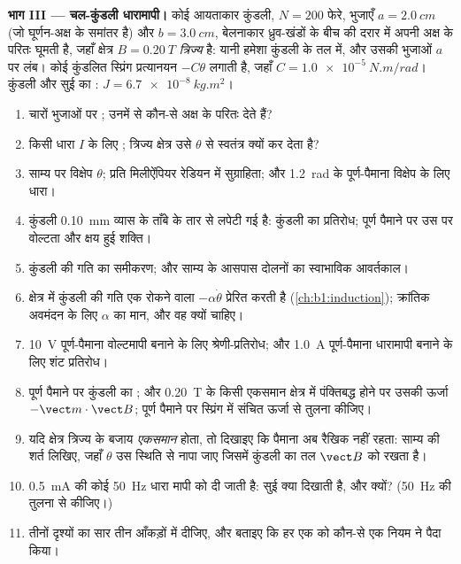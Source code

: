 \begin{problem}[{सप्ताहांत समस्या --- किसी समाक्ष तार पर ऐंपियर का नियम,
किसी विद्युत लाइन पर लाप्लास बल, और किसी चल-कुंडली धारामापी का
अभिकल्प}]
\medskip
\noindent\textbf{भाग III --- चल-कुंडली धारामापी।}
कोई आयताकार कुंडली, $N = 200$ फेरे, भुजाएँ $a = \qty{2.0}{cm}$ (जो
घूर्णन-अक्ष के समांतर है) और $b = \qty{3.0}{cm}$, बेलनाकार ध्रुव-खंडों के
बीच की दरार में अपनी अक्ष के परितः घूमती है, जहाँ क्षेत्र $B = \qty{0.20}{T}$
\emph{त्रिज्य} है: यानी हमेशा कुंडली के तल में, और उसकी भुजाओं $a$ पर लंब।
कोई कुंडलित स्प्रिंग प्रत्यानयन  $-C\theta$ लगाती है, जहाँ
$C = \qty{1.0e-5}{N.m/rad}$। कुंडली और सुई का :
$J = \qty{6.7e-8}{kg.m^2}$।
\begin{enumerate}[resume]
  \item चारों भुजाओं पर ; उनमें से कौन-से अक्ष के परितः
         देते हैं?
  \item किसी धारा $I$ के लिए ; त्रिज्य क्षेत्र उसे $\theta$ से
        स्वतंत्र क्यों कर देता है?
  \item साम्य पर विक्षेप $\theta$; प्रति मिलीऐंपियर रेडियन में सुग्राहिता;
        और \qty{1.2}{rad} के पूर्ण-पैमाना विक्षेप के लिए धारा।
  \item कुंडली \qty{0.10}{mm} व्यास के ताँबे के तार से लपेटी गई है:
        कुंडली का प्रतिरोध; पूर्ण पैमाने पर उस पर वोल्टता और क्षय हुई
        शक्ति।
  \item कुंडली की गति का समीकरण; और साम्य के आसपास दोलनों का स्वाभाविक
        आवर्तकाल।
  \item क्षेत्र में कुंडली की गति एक रोकने वाला 
        $-\alpha\dot\theta$ प्रेरित करती है (\cref{ch:b1:induction});
        क्रांतिक अवमंदन के लिए $\alpha$ का मान, और वह क्यों चाहिए।
  \item \qty{10}{V} पूर्ण-पैमाना वोल्टमापी बनाने के लिए श्रेणी-प्रतिरोध; और
        \qty{1.0}{A} पूर्ण-पैमाना धारामापी बनाने के लिए शंट प्रतिरोध।
  \item पूर्ण पैमाने पर कुंडली का ; और \qty{0.20}{T} के किसी
        एकसमान क्षेत्र में पंक्तिबद्ध होने पर उसकी ऊर्जा $-\vect m\cdot
        \vect B$; पूर्ण पैमाने पर स्प्रिंग में संचित ऊर्जा से तुलना कीजिए।
  \item यदि क्षेत्र त्रिज्य के बजाय \emph{एकसमान} होता, तो दिखाइए कि पैमाना
        अब रैखिक नहीं रहता: साम्य की शर्त लिखिए, जहाँ
        $\theta$ उस स्थिति से नापा जाए जिसमें कुंडली का तल
        $\vect B$ को रखता है।
  \item \qty{0.5}{mA}  की कोई \qty{50}{Hz} धारा मापी को दी जाती है:
        सुई क्या दिखाती है, और क्यों? (\qty{50}{Hz} की तुलना  से कीजिए।)
  \item तीनों दृश्यों का सार तीन आँकड़ों में दीजिए, और बताइए कि हर एक को
        कौन-से एक नियम ने पैदा किया।
\end{enumerate}
\end{problem}
